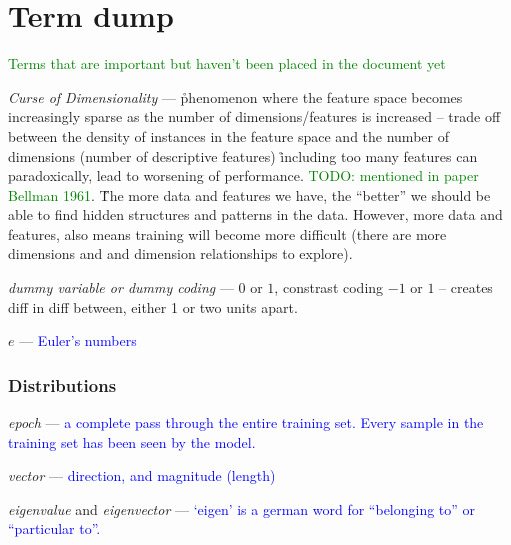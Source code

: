 \chapter{Term dump}

\textcolor{green}{Terms that are important but haven't been placed in the document yet}



\emph{Curse of Dimensionality} --- \r{phenomenon where the feature space becomes increasingly sparse as the number of dimensions/features is increased -- trade off between the density of instances in the feature space and the number of dimensions (number of descriptive features) \r{including too many features can paradoxically, lead to worsening of performance.} \textcolor{green}{TODO: mentioned in paper Bellman 1961}}. \r{The more data and features we have, the ``better'' we should be able to find hidden structures and patterns in the data. However, more data and features, also means training will become more difficult (there are more dimensions and and dimension relationships to explore).}

\emph{dummy variable or dummy coding} --- $0$ or $1$, constrast coding $-1$ or $1$ -- creates diff in diff between, either 1 or two units apart.



\emph{$e$} --- \textcolor{blue}{Euler's numbers}

\subsection{Distributions}



\emph{epoch} --- \textcolor{blue}{a complete pass through the entire training set. Every sample in the training set has been seen by the model.} 

\emph{vector} --- \textcolor{blue}{direction, and magnitude (length)}

\emph{eigenvalue} and \emph{eigenvector} --- \textcolor{blue}{`eigen' is a german word for ``belonging to'' or ``particular to''.} 

